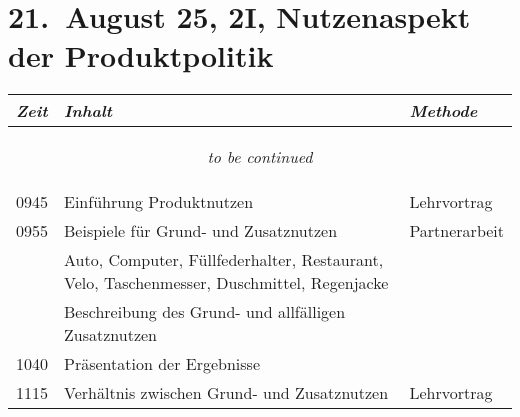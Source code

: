 \documentclass[a4paper]{scrreprt}
\begin{document}
\section*{21.\ August 25, 2I, Nutzenaspekt der Produktpolitik}
\begin{longtable}{p{1.5cm}>{\RaggedRight}p{7.5cm}p{2.5cm}}
    \toprule
    \emph{Zeit}&\emph{Inhalt}&\emph{Methode}\\
    \midrule
    \endhead

    \midrule
    \multicolumn{3}{c}{\begin{tiny}\textit{to be continued}\end{tiny}}\\
    \midrule
    \endfoot

    \bottomrule
    \endlastfoot

    0945&Einführung Produktnutzen&Lehrvortrag\\ [5pt]

    0955&Beispiele für Grund- und Zusatznutzen&Partnerarbeit\\
        &Auto, Computer, Füllfederhalter, Restaurant, Velo,
        Taschenmesser, Duschmittel, Regenjacke&\\
        &Beschreibung des Grund- und allfälligen Zusatznutzen&\\ [5pt]

    1040&Präsentation der Ergebnisse&\\ [5pt]

    1115&Verhältnis zwischen Grund- und Zusatznutzen&Lehrvortrag\\ [5pt]

\end{longtable}
\end{document}
